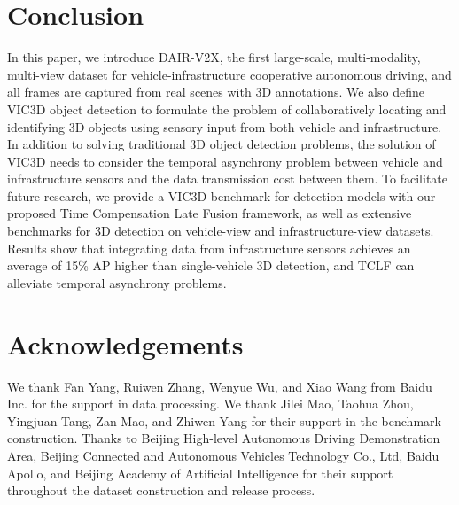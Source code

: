\documentclass[10pt,twocolumn,letterpaper]{article}
\begin{document}





\section{Conclusion}
In this paper, we introduce DAIR-V2X, the first large-scale, multi-modality, multi-view dataset for vehicle-infrastructure cooperative autonomous driving, and all frames are captured from real scenes with 3D annotations. 
We also define VIC3D object detection to formulate the problem of collaboratively locating and identifying 3D objects using sensory input from both vehicle and infrastructure. 
In addition to solving traditional 3D object detection problems, the solution of VIC3D needs to consider the temporal asynchrony problem between vehicle and infrastructure sensors and the data transmission cost between them.   
To facilitate future research, we provide a VIC3D benchmark for detection models with our proposed Time Compensation Late Fusion framework, as well as extensive benchmarks for 3D detection on vehicle-view and infrastructure-view datasets. 
Results show that integrating data from infrastructure sensors achieves an average of 15\% AP higher than single-vehicle 3D detection, and TCLF can alleviate temporal asynchrony problems.

\section*{Acknowledgements} 
We thank Fan Yang, Ruiwen Zhang, Wenyue Wu, and Xiao Wang from Baidu Inc. for the support in data processing. 
We thank Jilei Mao, Taohua Zhou, Yingjuan Tang, Zan Mao, and Zhiwen Yang for their support in the benchmark construction. 
Thanks to Beijing High-level Autonomous Driving Demonstration Area, Beijing Connected and Autonomous Vehicles Technology Co., Ltd, Baidu Apollo, and Beijing Academy of Artificial Intelligence for their support throughout the dataset construction and release process.


{\small


}
\end{document}
